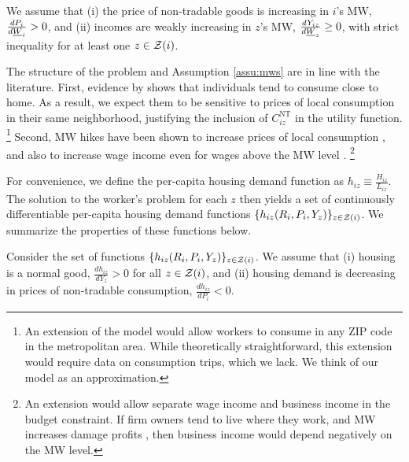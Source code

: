 \begin{assu}\label{assu:mws}
    We assume that
    (i) the price of non-tradable goods is increasing in $i$'s MW, 
    $\frac{d P_i}{d \underline{W}_i} > 0$, and
    (ii) incomes are weakly increasing in $z$'s MW, 
    $\frac{d Y_{iz}}{d \underline{W}_z} \geq 0$, with strict inequality 
    for at least one $z\in\mathcal{Z}(i)$.
\end{assu}

The structure of the problem and Assumption \ref{assu:mws} are in line with 
the literature.
First, evidence by \textcite{MiyauchiEtAl2021} shows that individuals tend to 
consume close to home.
As a result, we expect them to be sensitive to prices of local consumption in 
their same neighborhood, justifying the inclusion of $C^{\text{NT}}_{iz}$ in the 
utility function.%
\footnote{An extension of the model would allow workers to consume in any ZIP 
code in the metropolitan area.
While theoretically straightforward, this extension would require data on 
consumption trips, which we lack.
We think of our model as an approximation.}
Second, MW hikes have been shown to increase prices of local consumption 
\parencite[e.g.,][]{AllegrettoReich2018, Leung2021},
and also to increase wage income even for wages above the MW level 
\parencite[e.g.,][]{CegnizEtAl2019,Dube2019Income}.%
\footnote{An extension would allow separate wage income and business income in 
the budget constraint.
If firm owners tend to live where they work, and MW increases damage profits
\parencite[as found by, e.g.,][]{DracaMachinVanreenen2011, HarasztosiLidner2019},
then business income would depend negatively on the MW level.}

For convenience, we define the per-capita housing demand function as 
$h_{iz} \equiv \frac{H_{iz}}{L_{iz}}$.
The solution to the worker's problem for each $z$ then yields a set of 
continuously differentiable per-capita housing demand functions 
$\{h_{iz} (R_i, P_i, Y_z)\}_{z\in\mathcal{Z}(i)}$.
We summarize the properties of these functions below.

\begin{assu}\label{assu:housing_demand}
    Consider the set of functions $\{h_{iz} (R_i, P_i, Y_z)\}_{z\in\mathcal{Z}(i)}$.
    We assume that
    (i) housing is a normal good, 
    $\frac{d h_{iz}}{d Y_z} > 0$ for all $z\in\mathcal{Z}(i)$,
    and
    (ii) housing demand is decreasing in prices of non-tradable consumption, 
    $\frac{d h_{iz}}{d P_i} < 0$.
\end{assu}


